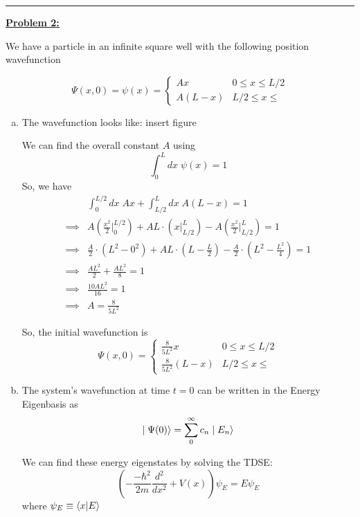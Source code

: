 \documentclass[twoside]{article}
\begin{document}
\vskip 0.5cm
\hrule
\vskip 0.5cm




\underline{\textbf{Problem 2:}}

We have a particle in an infinite square well with the following position wavefunction

\[ \Psi(x, 0) = \psi(x) = \begin{cases}
   Ax & 0 \leq x \leq L/2 \\
   A(L-x) & L/2 \leq x \leq 
\end{cases} \]

\begin{enumerate}[(a)]
   \item The wavefunction looks like:
   \vskip 0.5cm
   insert figure
   \vskip 0.5cm

   We can find the overall constant $A$ using
   \[ \int_{0}^{L} dx\; \psi(x) = 1\]
   So, we have 
   \begin{align*}
      &\int_{0}^{L/2} dx\;Ax + \int_{L/2}^{L} dx\;A(L-x) = 1 \\
      \implies&A \left(\frac{x^2}{2} \Biggr|_{0}^{L/2}\right) + AL \cdot \left(x \Biggr|_{L/2}^{L}\right) -A\left(\frac{x^2}{2} \Biggr|_{L/2}^{L}\right) = 1 \\
      \implies& \frac{A}{2}\cdot \left(L^2 - 0^2\right) + AL \cdot \left(L - \frac{L}{2}\right) - \frac{A}{2}\cdot \left(L^2 - \frac{L^2}{4}\right) = 1 \\
      \implies& \frac{AL^2}{2} + \frac{AL^2}{8} = 1 \\
      \implies& \frac{10AL^2}{16} = 1 \\
      \implies& \boxed{A = \frac{8}{5L^2}}
   \end{align*}

   So, the initial wavefunction is 
   \[ \boxed{\Psi(x, 0) = \begin{cases}
      \frac{8}{5L^2}x & 0 \leq x \leq L/2 \\
      \frac{8}{5L^2}(L-x) & L/2 \leq x \leq 
   \end{cases}
      } \]

   
   \item The system's wavefunction at time $t = 0$ can be written in the Energy Eigenbasis as 
   \[ \mid\Psi(0)\rangle = \sum_{0}^{\infty} c_n \mid E_n\rangle \]

   We can find these energy eigenstates by solving the TDSE:
   \[ \left(-\frac{-\hbar^2}{2m}\frac{d^2}{dx^2} + V(x)\right)\psi_E = E\psi_E \]
   where $\psi_E \equiv \langle x | E \rangle$
\end{enumerate}
\end{document}
